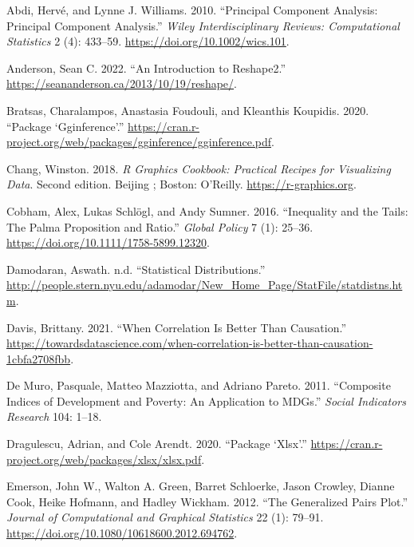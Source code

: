 \documentclass[
]{article}
\newlength{\cslhangindent}
\newlength{\cslentryspacingunit} %
\newenvironment{CSLReferences}[2] %
 {%
  \setlength{\parindent}{0pt}
  \ifodd #1
  \let\oldpar\par
  \def\par{\hangindent=\cslhangindent\oldpar}
  \fi
  \setlength{\parskip}{#2\cslentryspacingunit}
 }%
 {}
\begin{document}
\hypertarget{refs}{}
\begin{CSLReferences}{1}{0}
\leavevmode{}%
Abdi, Hervé, and Lynne J. Williams. 2010. {``Principal Component Analysis: Principal Component Analysis.''} \emph{Wiley Interdisciplinary Reviews: Computational Statistics} 2 (4): 433--59. \url{https://doi.org/10.1002/wics.101}.

\leavevmode{}%
Anderson, Sean C. 2022. {``An Introduction to Reshape2.''} \url{https://seananderson.ca/2013/10/19/reshape/}.

\leavevmode{}%
Bratsas, Charalampos, Anastasia Foudouli, and Kleanthis Koupidis. 2020. {``Package {`}Gginference{'}.''} \url{https://cran.r-project.org/web/packages/gginference/gginference.pdf}.

\leavevmode{}%
Chang, Winston. 2018. \emph{R Graphics Cookbook: Practical Recipes for Visualizing Data}. Second edition. Beijing ; Boston: O'Reilly. \url{https://r-graphics.org}.

\leavevmode{}%
Cobham, Alex, Lukas Schlögl, and Andy Sumner. 2016. {``Inequality and the Tails: The Palma Proposition and Ratio.''} \emph{Global Policy} 7 (1): 25--36. \url{https://doi.org/10.1111/1758-5899.12320}.

\leavevmode{}%
Damodaran, Aswath. n.d. {``Statistical Distributions.''} \url{http://people.stern.nyu.edu/adamodar/New_Home_Page/StatFile/statdistns.htm}.

\leavevmode{}%
Davis, Brittany. 2021. {``When Correlation Is Better Than Causation.''} \url{https://towardsdatascience.com/when-correlation-is-better-than-causation-1cbfa2708fbb}.

\leavevmode{}%
De Muro, Pasquale, Matteo Mazziotta, and Adriano Pareto. 2011. {``Composite Indices of Development and Poverty: An Application to MDGs.''} \emph{Social Indicators Research} 104: 1--18.

\leavevmode{}%
Dragulescu, Adrian, and Cole Arendt. 2020. {``Package {`Xlsx'}.''} \url{https://cran.r-project.org/web/packages/xlsx/xlsx.pdf}.

\leavevmode{}%
Emerson, John W., Walton A. Green, Barret Schloerke, Jason Crowley, Dianne Cook, Heike Hofmann, and Hadley Wickham. 2012. {``The Generalized Pairs Plot.''} \emph{Journal of Computational and Graphical Statistics} 22 (1): 79--91. \url{https://doi.org/10.1080/10618600.2012.694762}.


\end{CSLReferences}
\end{document}
